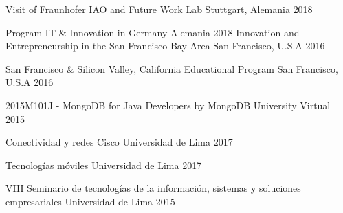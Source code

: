 



\begin{cvhonors}

  \cvhonor
    {Visit of Fraunhofer IAO and Future Work Lab} %
    {Stuttgart, Alemania} %
    {2018} %

  \cvhonor
    {Program IT \& Innovation in Germany} %
    {Alemania} %
    {2018} %
  \cvhonor
    {Innovation and Entrepreneurship in the San Francisco Bay Area} %
    {San Francisco, U.S.A} %
    {2016} %

  \cvhonor
    {San Francisco \& Silicon Valley, California Educational Program} %
    {San Francisco, U.S.A} %
    {2016} %

  \cvhonor
    {2015M101J - MongoDB for Java Developers by MongoDB University}
    {Virtual}
    {2015}

\end{cvhonors}




\begin{cvhonors}

  \cvhonor
    {Conectividad y redes Cisco} %
    {Universidad de Lima} %
    {2017} %

  \cvhonor
    {Tecnologías móviles} %
    {Universidad de Lima} %
    {2017} %

  \cvhonor
    {VIII Seminario de tecnologías de la información, sistemas y soluciones empresariales} %
    {Universidad de Lima} %
    {2015} %

\end{cvhonors}
